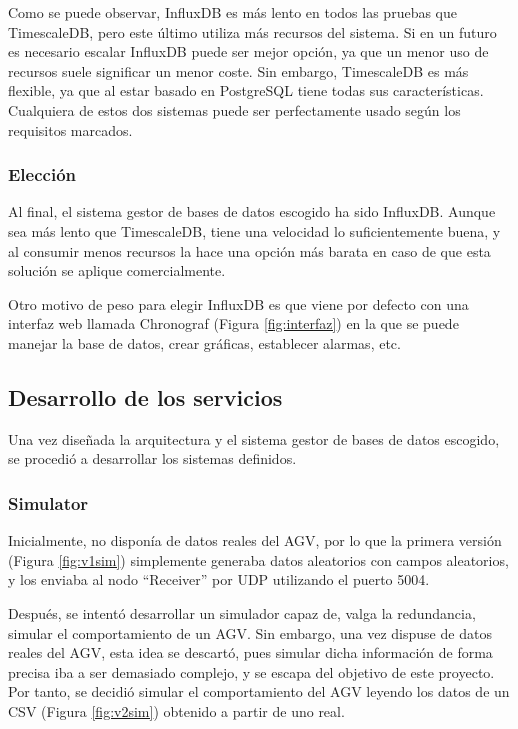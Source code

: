 Como se puede observar, InfluxDB es más lento en todos las pruebas que TimescaleDB, pero este último utiliza más 
recursos del sistema. Si en un futuro es necesario escalar InfluxDB puede ser mejor opción, ya que un menor uso de 
recursos suele significar un menor coste. Sin embargo, TimescaleDB es más flexible, ya que al estar basado en PostgreSQL 
tiene todas sus características. Cualquiera de estos dos sistemas puede ser perfectamente usado según los requisitos marcados.

\subsubsection{Elección}

Al final, el sistema gestor de bases de datos escogido ha sido InfluxDB. Aunque sea más lento que TimescaleDB, tiene
una velocidad lo suficientemente buena, y al consumir menos recursos la hace una opción más barata en caso de que 
esta solución se aplique comercialmente.

Otro motivo de peso para elegir InfluxDB es que viene por defecto con una interfaz web llamada Chronograf 
(Figura \ref*{fig:interfaz}) en la que se puede manejar la base de datos, crear gráficas, establecer alarmas, etc.


\subsection{Desarrollo de los servicios}

Una vez diseñada la arquitectura y el sistema gestor de bases de datos escogido, se procedió a desarrollar los
sistemas definidos.

\subsubsection{Simulator}
Inicialmente, no disponía de datos reales del AGV, por lo que la primera versión (Figura \ref*{fig:v1sim}) simplemente generaba datos aleatorios
con campos aleatorios, y los enviaba al nodo ``Receiver'' por UDP utilizando el puerto 5004.

Después, se intentó desarrollar un simulador capaz de, valga la redundancia, simular el comportamiento de un AGV. Sin
embargo, una vez dispuse de datos reales del AGV, esta idea se descartó, pues simular dicha información de forma
precisa iba a ser demasiado complejo, y se escapa del objetivo de este proyecto. Por tanto, se decidió simular el
comportamiento del AGV leyendo los datos de un CSV (Figura \ref*{fig:v2sim}) obtenido a partir de uno real.

